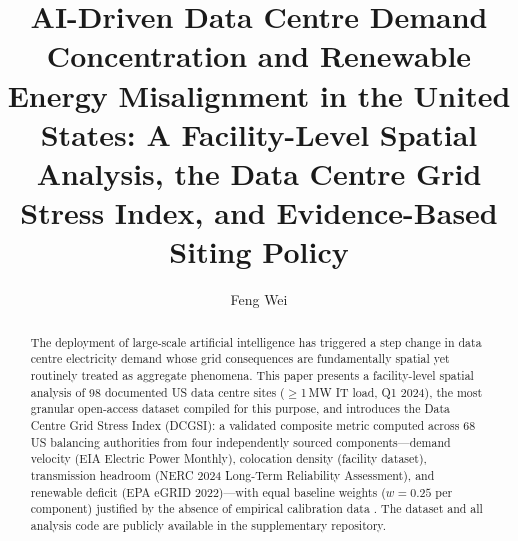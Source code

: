 \documentclass[preprint,12pt]{elsarticle}
\begin{document}
\begin{frontmatter}

\title{AI-Driven Data Centre Demand Concentration and Renewable Energy
       Misalignment in the United States: A Facility-Level Spatial Analysis,
       the Data Centre Grid Stress Index, and Evidence-Based Siting Policy}

\author[1]{Feng Wei}


\begin{abstract}
The deployment of large-scale artificial intelligence has triggered a step
change in data centre electricity demand whose grid consequences are
fundamentally spatial yet routinely treated as aggregate phenomena. This
paper presents a facility-level spatial analysis of 98 documented US data
centre sites ($\geq$1\,MW IT load, Q1 2024), the most granular open-access
dataset compiled for this purpose, and introduces the Data Centre Grid Stress
Index (DCGSI): a validated composite metric computed across 68 US balancing
authorities from four independently sourced components---demand velocity
(EIA Electric Power Monthly), colocation density (facility dataset),
transmission headroom (NERC 2024 Long-Term Reliability Assessment), and
renewable deficit (EPA eGRID 2022)---with equal baseline weights ($w=0.25$
per component) justified by the absence of empirical calibration data
\cite{oecd2008handbook}. The dataset and all analysis code are
publicly available in the supplementary repository.


\end{abstract}
\end{frontmatter}
\end{document}
